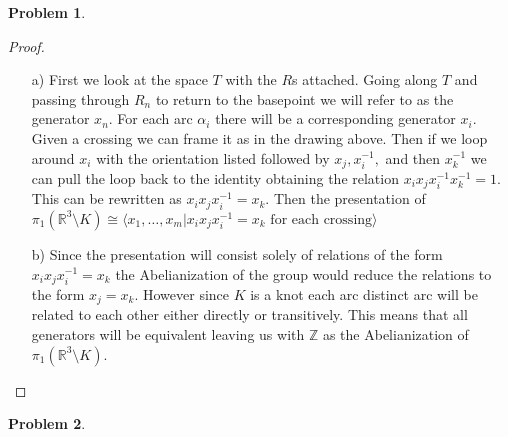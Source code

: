 \documentclass[10pt]{article}
\newcommand{\sk}{\vskip 10mm}
\newcommand{\bb}[1]{\mathbb{#1}}
\theoremstyle{plain}
\newtheorem{problem}{Problem}
\theoremstyle{remark}
\begin{document}
\sk

\begin{problem} %
  
\end{problem}

\begin{proof}
  \begin{itemize}
  \item[a)] First we look at the space $T$ with the $R$s attached. Going along
    $T$ and passing through $R_n$ to return to the basepoint we will refer
    to as the generator $x_n$. For each arc $\alpha_i$ there will be a
    corresponding generator $x_i$. Given a crossing we can frame it as in
    the drawing above. Then if we loop around $x_i$ with the orientation
    listed followed by $x_j,x_i^{-1},$ and then $x_k^{-1}$ we can pull
    the loop back to the identity obtaining the relation $x_ix_jx_i^{-1}x_k^{-1}=1$.
    This can be rewritten as $x_ix_jx_i^{-1}=x_k$. Then the presentation
    of $\pi_1(\bb{R}^3\setminus K)\cong\langle x_1,\ldots,x_m|x_ix_jx_i^{-1}=x_k \text{\ for each crossing}\rangle$
  \item[b)] Since the presentation will consist solely of relations of the
    form $x_ix_jx_i^{-1}=x_k$ the Abelianization of the group would reduce
    the relations to the form $x_j=x_k$. However since $K$ is a knot each
    arc distinct arc will be related to each other either directly or
    transitively. This means that all generators will be equivalent leaving
    us with $\bb{Z}$ as the Abelianization of $\pi_1(\bb{R}^3\setminus K)$.
  \end{itemize}
\end{proof}

\sk

\begin{problem} %
  
\end{problem}
\end{document}
